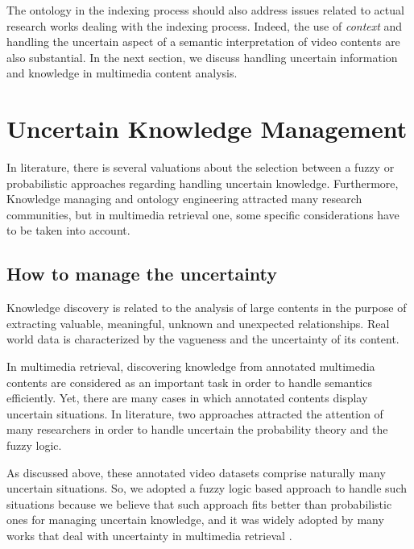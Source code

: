 		The ontology  in the indexing process should also address issues related to 
		actual research works dealing with the indexing process. Indeed, the use of 
		\emph{context} and handling the uncertain aspect of a semantic interpretation 
		of video contents are also substantial. In the next section, we discuss handling 
		uncertain information and knowledge in multimedia content analysis.

	\section{Uncertain Knowledge Management}

		In literature, there is several valuations about the selection between a fuzzy 
		or probabilistic approaches regarding handling uncertain knowledge. Furthermore, 
		Knowledge managing and ontology engineering attracted many research communities, 
		but in multimedia retrieval one, some specific considerations have to be taken into account.

		\subsection{How to manage the uncertainty}

		Knowledge discovery is related to the analysis of large contents in the purpose of 
		extracting valuable, meaningful, unknown and unexpected relationships. Real world data is 
		characterized by the vagueness and the uncertainty of its content.
	
		In multimedia retrieval, discovering knowledge from annotated multimedia contents are
		considered as an important task in order to handle semantics efficiently. 
		Yet, there are many cases in which annotated contents display uncertain situations. 
		In literature, two approaches attracted the attention of many researchers in order 
		to handle uncertain  the probability theory and the fuzzy logic.

		As discussed above, these annotated video datasets comprise naturally
		many uncertain situations. So, we adopted a fuzzy logic based approach \citep{zadeh3,zadeh2,zadeh1}
		to handle such situations because we believe that such approach fits better than probabilistic 
		ones for managing uncertain knowledge, and it was widely adopted by many works that 
		deal with uncertainty in multimedia retrieval
		\citep{Bloch2005,Hudelot2008,Simou2008,Dasiopoulou2009,Bannour2014}.

